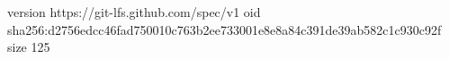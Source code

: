 version https://git-lfs.github.com/spec/v1
oid sha256:d2756edcc46fad750010c763b2ee733001e8e8a84c391de39ab582c1c930c92f
size 125
